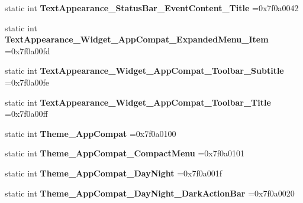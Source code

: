 \begin{DoxyCompactItemize}
static int {\bfseries Text\+Appearance\+\_\+\+Status\+Bar\+\_\+\+Event\+Content\+\_\+\+Title} =0x7f0a0042
\item 
\mbox{\label{classandroid_1_1support_1_1v7_1_1recyclerview_1_1R_1_1style_a820a7b4ce9c652b76dd22528081212d7}} 
static int {\bfseries Text\+Appearance\+\_\+\+Widget\+\_\+\+App\+Compat\+\_\+\+Expanded\+Menu\+\_\+\+Item} =0x7f0a00fd
\item 
\mbox{\label{classandroid_1_1support_1_1v7_1_1recyclerview_1_1R_1_1style_a0f860ff00529f8c3d1d5055a6d656a26}} 
static int {\bfseries Text\+Appearance\+\_\+\+Widget\+\_\+\+App\+Compat\+\_\+\+Toolbar\+\_\+\+Subtitle} =0x7f0a00fe
\item 
\mbox{\label{classandroid_1_1support_1_1v7_1_1recyclerview_1_1R_1_1style_a2f48530bba1f5adc521b81542f4bf124}} 
static int {\bfseries Text\+Appearance\+\_\+\+Widget\+\_\+\+App\+Compat\+\_\+\+Toolbar\+\_\+\+Title} =0x7f0a00ff
\item 
\mbox{\label{classandroid_1_1support_1_1v7_1_1recyclerview_1_1R_1_1style_a432a23f371b230c44447363d5d8c8bf4}} 
static int {\bfseries Theme\+\_\+\+App\+Compat} =0x7f0a0100
\item 
\mbox{\label{classandroid_1_1support_1_1v7_1_1recyclerview_1_1R_1_1style_a95784a8334b921383204e2e4fb3add63}} 
static int {\bfseries Theme\+\_\+\+App\+Compat\+\_\+\+Compact\+Menu} =0x7f0a0101
\item 
\mbox{\label{classandroid_1_1support_1_1v7_1_1recyclerview_1_1R_1_1style_a478b645c96a0ab71315ab1a785490606}} 
static int {\bfseries Theme\+\_\+\+App\+Compat\+\_\+\+Day\+Night} =0x7f0a001f
\item 
\mbox{\label{classandroid_1_1support_1_1v7_1_1recyclerview_1_1R_1_1style_a9fd8f107e054ae1d924e0208a21fce96}} 
static int {\bfseries Theme\+\_\+\+App\+Compat\+\_\+\+Day\+Night\+\_\+\+Dark\+Action\+Bar} =0x7f0a0020

\end{DoxyCompactItemize}
